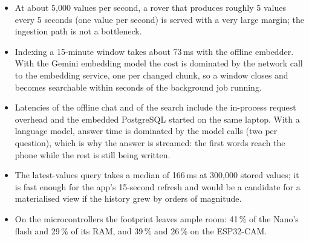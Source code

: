 \begin{itemize}
\item At about 5,000 values per second, a rover that produces roughly 5 values every 5 seconds (one value per second) is
      served with a very large margin; the ingestion path is not a bottleneck.
\item Indexing a 15-minute window takes about 73\,ms with the offline embedder. With the Gemini embedding model the cost is dominated by the
      network call to the embedding service, one per changed chunk, so a window closes and becomes searchable within seconds of the
      background job running.
\item Latencies of the offline chat and of the search include the in-process request overhead and the embedded PostgreSQL started
      on the same laptop. With a language model, answer time is dominated by the model calls (two per question), which is why the answer is
      streamed: the first words reach the phone while the rest is still being written.
\item The latest-values query takes a median of 166\,ms at 300,000 stored values; it is fast enough for the app's 15-second refresh
      and would be a candidate for a materialised view if the history grew by orders of magnitude.
\item On the microcontrollers the footprint leaves ample room: 41\,\% of the Nano's flash and 29\,\% of its RAM, and 39\,\% and 26\,\% on the ESP32-CAM.
\end{itemize}
